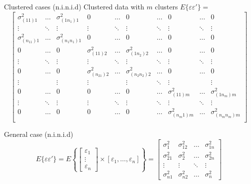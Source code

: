 \documentclass{beamer}
\begin{document}
\begin{frame}{Clustered cases (n.i.n.i.d)}
Clustered data with $m$ clusters 
\footnotesize 
$E\{\varepsilon\varepsilon'\}=$ \[\left[\begin{matrix}
\sigma^2_{(11)1} & \dots & \sigma^2_{(1n_1)1}&0&\dots&0&\dots&0& \dots & 0\\
\vdots & \ddots & \vdots&\vdots & \ddots & \vdots&\ddots&\vdots & \ddots & \vdots\\
\sigma^2_{(n_11)1} & \dots & \sigma^2_{(n_1n_1)1}&0&\dots&0&\dots&0& \dots & 0\\
0&\dots&0&\sigma^2_{(11)2} & \dots & \sigma^2_{(1n_2)2}&\dots&0& \dots & 0\\
\vdots & \ddots & \vdots&\vdots & \ddots & \vdots&\ddots&\vdots & \ddots & \vdots\\
0&\dots&0&\sigma^2_{(n_21)2} & \dots & \sigma^2_{(n_2n_2)2}&\dots&0& \dots & 0\\
\vdots&&\vdots&\vdots&&\vdots&\ddots&\vdots&&\vdots\\
0&\dots&0&0& \dots & 0&\dots&\sigma^2_{(11)m} & \dots & \sigma^2_{(1n_m)m}\\
\vdots & \ddots & \vdots&\vdots & \ddots & \vdots&\ddots&\vdots & \ddots & \vdots\\
0&\dots&0&0& \dots & 0&\dots&\sigma^2_{(n_m1)m} & \dots & \sigma^2_{(n_mn_m)m}\\
\end{matrix} \right] \]
\end{frame}

\begin{frame}{General case (n.i.n.i.d)}
\[E\{\varepsilon\varepsilon'\}=E\left\{ \left[\begin{array}{c}
\varepsilon_1 \\
\vdots \\
\varepsilon_n
\end{array} \right] \times [\varepsilon_1,  \dots , \varepsilon_n]\right\}= \left[\begin{array}{cccc}
\sigma^2_1 & \sigma^2_{12}& \dots & \sigma^2_{1n}\\
\sigma^2_{21} & \sigma^2_2 &\dots& \sigma^2_{2n}\\
\vdots & \vdots & \ddots&\vdots \\
\sigma^2_{n1}&\sigma^2_{n2} &\dots&\sigma^2_n
\end{array} \right] \]

\end{frame}
\end{document}
